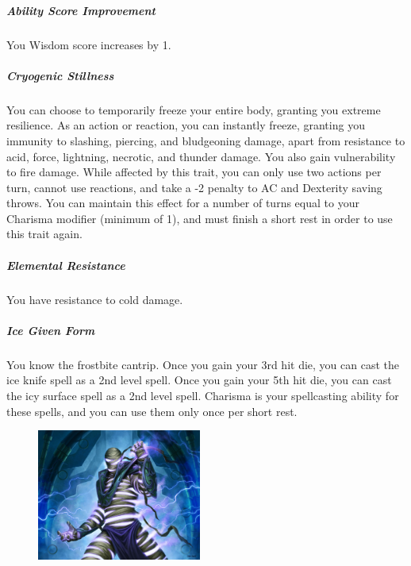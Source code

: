     \subparagraph{Ability Score Improvement} You Wisdom score increases by 1.

    \subparagraph{Cryogenic Stillness} You can choose to temporarily freeze your entire body, granting you extreme resilience.
    As an action or reaction, you can instantly freeze, granting you immunity to slashing, piercing, and bludgeoning damage, apart from resistance to acid, force, lightning, necrotic, and thunder damage.
    You also gain vulnerability to fire damage.
    While affected by this trait, you can only use two actions per turn, cannot use reactions, and take a -2 penalty to AC and Dexterity saving throws.
    You can maintain this effect for a number of turns equal to your Charisma modifier (minimum of 1), and must finish a short rest in order to use this trait again.

    \subparagraph{Elemental Resistance} You have resistance to cold damage.

    \subparagraph{Ice Given Form} You know the frostbite cantrip.
    Once you gain your 3rd hit die, you can cast the ice knife spell as a 2nd level spell.
    Once you gain your 5th hit die, you can cast the icy surface spell as a 2nd level spell.
    Charisma is your spellcasting ability for these spells, and you can use them only once per short rest.

\begin{figure}[!b]
    \centering
    \includegraphics[width=0.48\textwidth]{04kins/img/20zaloth_thunder.jpg}
\end{figure}

\newpage
